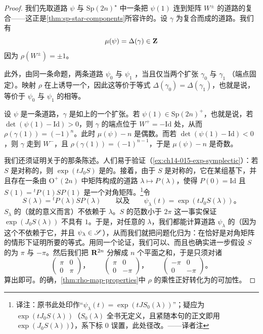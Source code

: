 \begin{proof}
我们先取道路 $\psi$ 与 $\mathrm{Sp}(2n)^\star$ 中一条把 $\psi(1)$ 连到矩阵 $W^{\pm}$ 的道路的复合——这正是\cref{thm:sp-star-components}所容许的。设 $\gamma$ 为复合而成的道路。我们有
\[
\mu(\psi)=\Delta(\gamma)\in\mathbf{Z}
\]
因为 $\rho(W^{\pm})=\pm1$。

此外，由同一条命题，两条道路 $\psi_0$ 与 $\psi_1$ \trHomotopic，当且仅当两个扩张 $\gamma_0$ 与 $\gamma_1$ \trHomotopic{}（端点固定）。映射 $\rho$ 在\trFundamentalGroup{}上诱导一个\trIsomorphism，因此这等价于等式 $\Delta(\gamma_0)=\Delta(\gamma_1)$，也就是说，等价于 $\psi_0$ 与 $\psi_1$ 的\trMaslovIndex{}相等。

设 $\psi$ 是一条道路，$\gamma$ 是如上的一个扩张。若 $\psi(1)\in\mathrm{Sp}(2n)^{+}$，也就是说，若 $\det(\psi(1)-\mathrm{Id})>0$，则 $\gamma$ 的端点位于 $W^{+}=-\mathrm{Id}$ 处，从而 $\rho(\gamma(1))=(-1)^n$。此时 $\mu(\psi)-n$ 是偶数。而若 $\det(\psi(1)-\mathrm{Id})<0$，则 $\gamma$ 走到 $W^{-}$，且 $\rho(\gamma(1))=(-1)^{n-1}$，于是 $\mu(\psi)-n$ 是奇数。

我们还须证明关于\trSymmetricMatrix{}的那条陈述。人们易于验证（\cref{ex:ch14-015-exp-symplectic}）：若 $S$ 是对称的，则 $\exp(tJ_0S)$ 是\trSymplectic{}的。接着，由于 $S$ 是对称的，它在某组\trOrthonormal{}基下\trDiagonalizable，并且存在一条由 $\mathrm{O}^{+}(2n)$ 中矩阵构成的道路 $\lambda\mapsto P(\lambda)$，使得 $P(0)=\mathrm{Id}$ 且 $S(1)={}^tP(1)SP(1)$ 是一个对角矩阵。\footnote{译注：原书此处印作“$\psi_\lambda(t)=\exp(tJS_0(\lambda))$”；疑应为 $\exp(tJ_0S(\lambda))$（$S_0(\lambda)$ 全书无定义，且紧随本句的正文即用 $\exp(J_0S(\lambda))$），系下标 $0$ 误置，此处径改。——译者注}令
\[
S(\lambda)={}^tP(\lambda)SP(\lambda)\qquad\text{以及}\qquad \psi_\lambda(t)=\exp(tJ_0S(\lambda))\text{。}
\]
\trSymmetricMatrix{} $S_\lambda$ 的\trIndex{}（就\trQuadraticForm{}的意义而言）不依赖于 $\lambda$。$S$ 的范数小于 $2\pi$ 这一事实保证 $\exp(J_0S(\lambda))$ 不具有\trEigenvalue{} $1$。于是，对任意的 $\lambda$，我们都能计算道路 $\psi_\lambda$ 的\trMaslovIndex{}（因为这个\trIndex{}不依赖于它，并且 $\psi_\lambda\in\mathscr{S}$），从而我们就把问题化归为：在\trSymmetricMatrix{}恰好是对角矩阵的情形下证明所要的等式。用同一个论证，我们可以、而且也确实进一步假设 $S$ 的\trEigenvalue{}为 $\pi$ 与 $-\pi$。然后我们把 $\mathbf{R}^{2n}$ 分解成 $n$ 个\trSymplectic{}平面之和，于是只须对诸\trSymmetricMatrix
\[
\begin{pmatrix}\pi&0\\0&\pi\end{pmatrix}\text{，}\qquad
\begin{pmatrix}\pi&0\\0&-\pi\end{pmatrix}\text{，}\qquad
\begin{pmatrix}-\pi&0\\0&-\pi\end{pmatrix}\text{。}
\]
算出\trMaslovIndex{}即可。的确，\cref{thm:rho-map-properties}中 $\rho$ 的乘性正好转化为\trMaslovIndex{}的可加性。


\end{proof}
